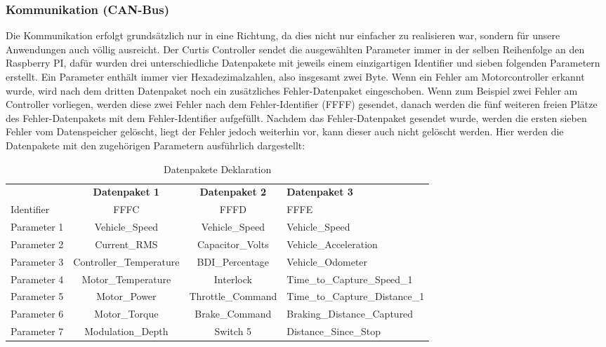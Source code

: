 \newpage

\subsubsection{Kommunikation (CAN-Bus)}
Die Kommunikation erfolgt grundsätzlich nur in eine Richtung, da dies nicht nur einfacher zu realisieren war, sondern für unsere Anwendungen auch völlig ausreicht. Der Curtis Controller sendet die ausgewählten Parameter immer in der selben Reihenfolge an den Raspberry PI, dafür wurden drei unterschiedliche Datenpakete mit jeweils einem einzigartigen Identifier und sieben folgenden Parametern erstellt. Ein Parameter enthält immer vier Hexadezimalzahlen, also insgesamt zwei Byte. Wenn ein Fehler am Motorcontroller erkannt wurde, wird nach dem dritten Datenpaket noch ein zusätzliches Fehler-Datenpaket eingeschoben. Wenn zum Beispiel zwei Fehler am Controller vorliegen, werden diese zwei Fehler nach dem Fehler-Identifier (FFFF) gesendet, danach werden die fünf weiteren freien Plätze des Fehler-Datenpakets mit dem Fehler-Identifier aufgefüllt. Nachdem das Fehler-Datenpaket gesendet wurde, werden die ersten sieben Fehler vom Datenspeicher gelöscht, liegt der Fehler jedoch weiterhin vor, kann dieser auch nicht gelöscht werden. Hier werden die Datenpakete mit den zugehörigen Parametern ausführlich dargestellt:

\setlength{\tabcolsep}{9pt}
\begin{table}[H]
	\begin{tabular}{|lcc>{\centering\arraybackslash}p{5cm}|}\hline
	\rowcolor[gray]{0.8} & \textbf{Datenpaket 1} & \textbf{Datenpaket 2} & \textbf{Datenpaket 3}\\[3pt]
		Identifier	& FFFC & FFFD & FFFE\\\hline
		Parameter 1 & Vehicle\_Speed & Vehicle\_Speed & Vehicle\_Speed\\\hline
		Parameter 2 & Current\_RMS	& Capacitor\_Volts & Vehicle\_Acceleration\\\hline
		Parameter 3 & Controller\_Temperature & BDI\_Percentage & Vehicle\_Odometer\\\hline
		Parameter 4 & Motor\_Temperature	& Interlock	& Time\_to\_Capture\_Speed\_1\\\hline		
		Parameter 5	& Motor\_Power 	& Throttle\_Command & Time\_to\_Capture\_Distance\_1\\\hline
		Parameter 6	& Motor\_Torque 	& Brake\_Command	& Braking\_Distance\_Captured\\\hline
		Parameter 7 & Modulation\_Depth & Switch 5 & Distance\_Since\_Stop\\\hline		
	\end{tabular}	
	\caption{Datenpakete Deklaration}
	\label{tab:Datenpakete_Deklaration}
\end{table}

